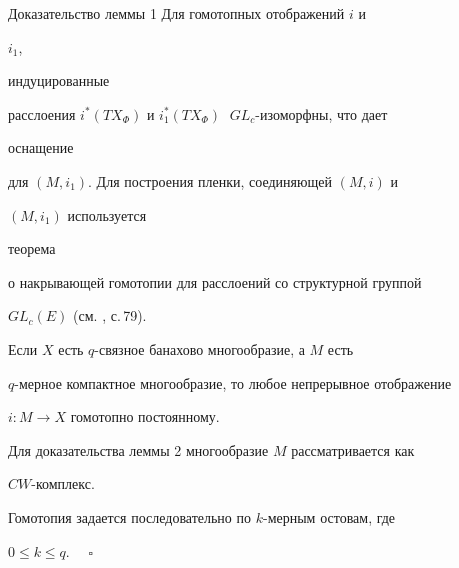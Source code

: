  


\begin{pf*}{Доказательство леммы 1} Для гомотопных отображений $i$ и 


$i_1$, 


индуцированные 


расслоения $i^*(TX_\Phi)$ и $i^*_1(TX_\Phi)\;$ $GL_c$-изоморфны, что дает 


оснащение 


для $(M,i_1)$. Для построения пленки, соединяющей $(M,i)$ и 


$(M,i_1)$ используется 


теорема 


о накрывающей гомотопии для расслоений со структурной группой 


$GL_c(E)$ (см. \cite{Hm}, с.\,79). 


\end{pf*} 


 


\begin{lem} Если $X$ есть $q$-связное банахово многообразие, а $M$ есть 


$q$-мерное компактное многообразие, то любое непрерывное отображение 


$i:M\to X$ гомотопно постоянному. 


\end{lem} 


 


Для доказательства леммы 2 многообразие $M$ рассматривается как 


$CW$-комплекс. 


Гомотопия задается последовательно по $k$-мерным остовам, где 


$0\le k\le q$. $\quad\square$ 


 


